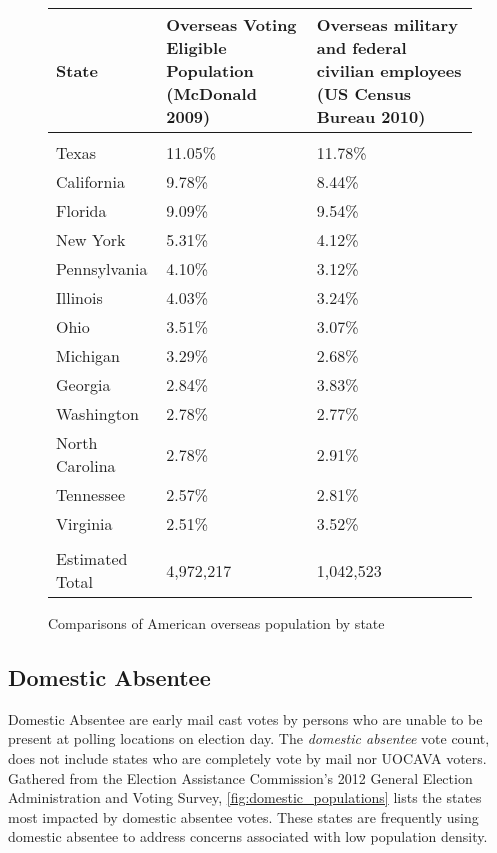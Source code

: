 \begin{figure}
\begin{center}
\begin{tabular}{l p{} p{}} %
{\bf State} & {\bf Overseas Voting Eligible \newline Population} \newline(McDonald 2009) & {\bf Overseas military and federal \newline civilian employees} \newline(US Census Bureau 2010)\\\hline\\
Texas & 11.05\% & 11.78\%\\
California & 9.78\% & 8.44\% \\
Florida & 9.09\% & 9.54\% \\
New York & 5.31\% & 4.12\% \\
Pennsylvania & 4.10\% & 3.12\% \\
Illinois & 4.03\% & 3.24\% \\
Ohio & 3.51\% & 3.07\% \\
Michigan & 3.29\% & 2.68\% \\
Georgia & 2.84\% & 3.83\% \\
Washington & 2.78\% & 2.77\% \\
North Carolina & 2.78\% & 2.91\% \\
Tennessee & 2.57\% & 2.81\% \\
Virginia & 2.51\% & 3.52\% \\\hline\\
Estimated Total & 4,972,217 & 1,042,523
\end{tabular}
\end{center}
\caption{Comparisons of American overseas population by state}
\label{fig:uocava_populations}
\end{figure}


\begin{center}
\end{center}

\subsection{Domestic Absentee}
Domestic Absentee are early mail cast votes by persons who are unable to be present at polling locations on election day. The {\em domestic absentee} vote count, does not include states who are completely vote by mail nor UOCAVA voters. Gathered from the Election Assistance Commission's 2012 General Election Administration and Voting Survey, \autoref{fig:domestic_populations} lists the states most impacted by domestic absentee votes. These states are frequently using domestic absentee to address concerns associated with low population density.

